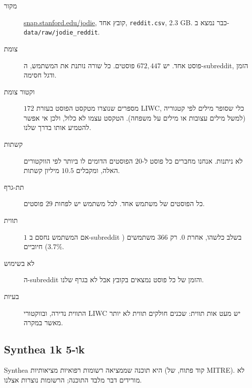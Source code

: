 \documentclass[11pt]{article}
\newcommand{\en}[1]{\foreignlanguage{english}{#1}}
\begin{document}
\begin{description}
\item[מקור] \href{http://snap.stanford.edu/jodie/reddit.csv}{\en{snap.stanford.edu/jodie}}, קובץ
אחד, \texttt{\en{reddit.csv}}, \en{2.3 GB}. כבר נמצא ב-\texttt{\en{data/raw/jodie\_reddit}}.
\item[צומת] פוסט אחד. יש $672{,}447$ פוסטים. כל שורה נותנת את המשתמש, ה-\en{subreddit}, הזמן
ודגל חסימה.
\item[וקטור צומת] $172$ מספרים שנוצרו מטקסט הפוסט בעזרת \en{LIWC}, כלי שסופר מילים לפי קטגוריה
(למשל מילים עצובות או מילים על משפחה). הטקסט עצמו לא כלול, ולכן אי אפשר להטמיע אותו בדרך שלנו.
\item[קשתות] לא ניתנות. אנחנו מחברים כל פוסט ל-$20$ הפוסטים הדומים לו ביותר לפי הווקטורים האלה,
ומקבלים $10.5$ מיליון קשתות.
\item[תת-גרף] כל הפוסטים של משתמש אחד. לכל משתמש יש לפחות $29$ פוסטים.
\item[תווית] $1$ אם המשתמש נחסם ב-\en{subreddit} בשלב כלשהו, אחרת $0$. רק $366$ משתמשים
($3.7\%$) חיוביים.
\item[לא בשימוש] ה-\en{subreddit} והזמן של כל פוסט נמצאים בקובץ אבל לא בגרף שלנו.
\item[בעיות] התווית נדירה, ובווקטורי \en{LIWC} יש מעט אות תווית: שכנים חולקים תווית לא יותר
מאשר במקרה.
\end{description}

\subsection*{\en{Synthea 1k} ו-\en{5k}}

\en{Synthea} היא תוכנה שממציאה רשומות רפואיות מציאותיות (קוד פתוח, של \en{MITRE}). לא מורידים
דבר מלבד התוכנה; הרשומות נוצרות אצלנו.
\end{document}
